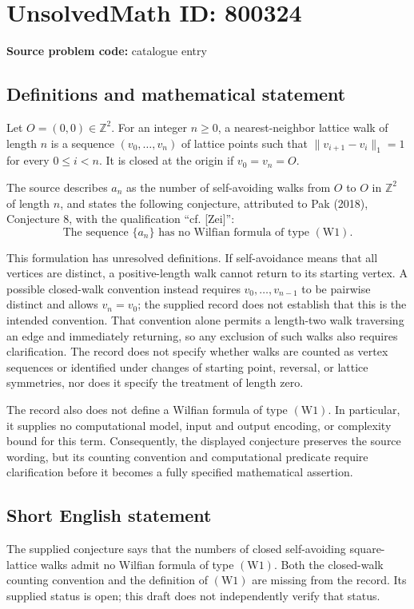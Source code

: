 \documentclass[11pt]{article}
\newcommand{\Z}{\mathbb{Z}}
\begin{document}
\section*{UnsolvedMath ID: 800324}
\textbf{Source problem code:} catalogue entry
\subsection{Definitions and mathematical statement}
Let \(O=(0,0)\in\Z^2\). For an integer \(n\geq 0\), a nearest-neighbor lattice walk of length \(n\) is a sequence \((v_0,\ldots,v_n)\) of lattice points such that \(\lVert v_{i+1}-v_i\rVert_1=1\) for every \(0\leq i<n\). It is closed at the origin if \(v_0=v_n=O\).

The source describes \(a_n\) as the number of self-avoiding walks from \(O\) to \(O\) in \(\Z^2\) of length \(n\), and states the following conjecture, attributed to Pak (2018), Conjecture 8, with the qualification ``cf. [Zei]'':
\[
\text{The sequence }\{a_n\}\text{ has no Wilfian formula of type }\mathrm{(W1)}.
\]

This formulation has unresolved definitions. If self-avoidance means that all vertices are distinct, a positive-length walk cannot return to its starting vertex. A possible closed-walk convention instead requires \(v_0,\ldots,v_{n-1}\) to be pairwise distinct and allows \(v_n=v_0\); the supplied record does not establish that this is the intended convention. That convention alone permits a length-two walk traversing an edge and immediately returning, so any exclusion of such walks also requires clarification. The record does not specify whether walks are counted as vertex sequences or identified under changes of starting point, reversal, or lattice symmetries, nor does it specify the treatment of length zero.

The record also does not define a Wilfian formula of type \(\mathrm{(W1)}\). In particular, it supplies no computational model, input and output encoding, or complexity bound for this term. Consequently, the displayed conjecture preserves the source wording, but its counting convention and computational predicate require clarification before it becomes a fully specified mathematical assertion.
\subsection{Short English statement}
The supplied conjecture says that the numbers of closed self-avoiding square-lattice walks admit no Wilfian formula of type \(\mathrm{(W1)}\). Both the closed-walk counting convention and the definition of \(\mathrm{(W1)}\) are missing from the record. Its supplied status is open; this draft does not independently verify that status.
\end{document}
